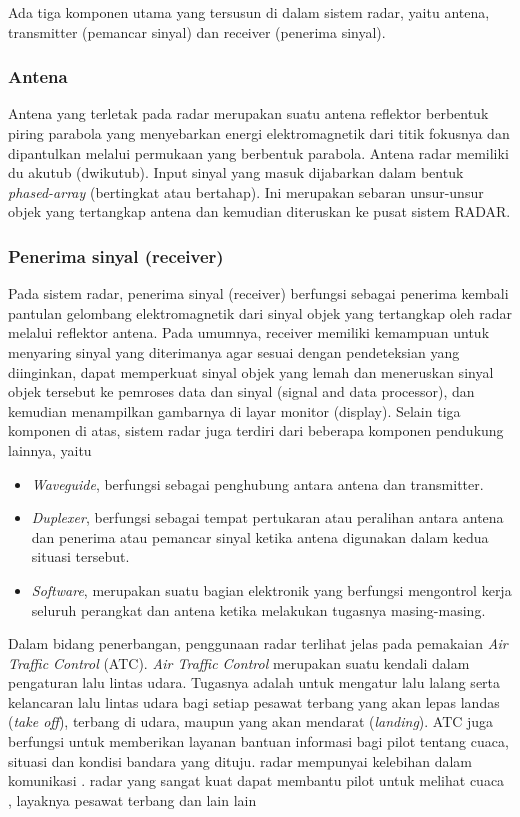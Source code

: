 \documentclass[9pt,twocolumn,twoside]{Gunadarma}
\begin{document}
Ada tiga komponen utama yang tersusun di dalam sistem radar, yaitu antena, transmitter (pemancar sinyal) dan receiver (penerima sinyal).
\subsubsection{Antena}
Antena yang terletak pada radar merupakan suatu antena reflektor berbentuk piring parabola yang menyebarkan energi elektromagnetik dari titik fokusnya dan dipantulkan melalui permukaan yang berbentuk parabola. Antena radar memiliki du akutub (dwikutub). Input sinyal yang masuk dijabarkan dalam bentuk \textit{phased-array} (bertingkat atau bertahap). Ini merupakan sebaran unsur-unsur objek yang tertangkap antena dan kemudian diteruskan ke pusat sistem RADAR.

\subsubsection{Penerima sinyal (receiver)}
Pada sistem radar, penerima sinyal (receiver) berfungsi sebagai penerima kembali pantulan gelombang elektromagnetik dari sinyal objek yang tertangkap oleh radar melalui reflektor antena. Pada umumnya, receiver memiliki kemampuan untuk menyaring sinyal yang diterimanya agar sesuai dengan pendeteksian yang diinginkan, dapat memperkuat sinyal objek yang lemah dan meneruskan sinyal objek tersebut ke pemroses data dan sinyal (signal and data processor), dan kemudian menampilkan gambarnya di layar monitor (display). Selain tiga komponen di atas, sistem radar juga terdiri dari beberapa komponen pendukung lainnya, yaitu

\begin{itemize}
	\item \textit{Waveguide}, berfungsi sebagai penghubung antara antena dan transmitter. 
	\item \textit{Duplexer},  berfungsi sebagai tempat pertukaran atau peralihan antara antena dan penerima atau pemancar sinyal ketika antena digunakan dalam kedua situasi tersebut.
	\item \textit{Software}, merupakan suatu bagian elektronik yang berfungsi mengontrol kerja seluruh perangkat dan antena ketika melakukan tugasnya masing-masing.

\end{itemize}

Dalam bidang penerbangan, penggunaan radar terlihat jelas pada pemakaian \textit{Air Traffic Control} (ATC). \textit{Air Traffic Control} merupakan suatu kendali dalam pengaturan lalu lintas udara. Tugasnya adalah untuk mengatur lalu lalang serta kelancaran lalu lintas udara bagi setiap pesawat terbang yang akan lepas landas (\textit{take off}), terbang di udara, maupun yang akan mendarat (\textit{landing}). ATC juga berfungsi untuk memberikan layanan bantuan informasi bagi pilot tentang cuaca, situasi dan kondisi bandara yang dituju. radar mempunyai kelebihan dalam komunikasi . radar yang sangat kuat dapat membantu pilot untuk melihat cuaca , layaknya pesawat terbang dan lain lain
\end{document}

